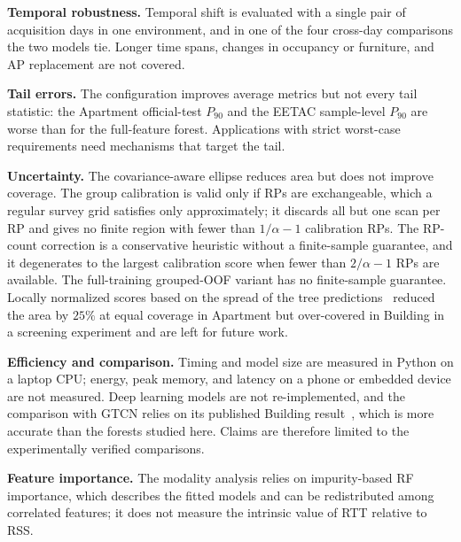 \textbf{Temporal robustness.} Temporal shift is evaluated with a single pair of acquisition days in one environment, and in one of the four cross-day comparisons the two models tie. Longer time spans, changes in occupancy or furniture, and AP replacement are not covered.

\textbf{Tail errors.} The configuration improves average metrics but not every tail statistic: the Apartment official-test $P_{90}$ and the EETAC sample-level $P_{90}$ are worse than for the full-feature forest. Applications with strict worst-case requirements need mechanisms that target the tail.

\textbf{Uncertainty.} The covariance-aware ellipse reduces area but does not improve coverage. The group calibration is valid only if RPs are exchangeable, which a regular survey grid satisfies only approximately; it discards all but one scan per RP and gives no finite region with fewer than $1/\alpha-1$ calibration RPs. The RP-count correction is a conservative heuristic without a finite-sample guarantee, and it degenerates to the largest calibration score when fewer than $2/\alpha-1$ RPs are available. The full-training grouped-OOF variant has no finite-sample guarantee. Locally normalized scores based on the spread of the tree predictions~\cite{lei2018distribution} reduced the area by $25\%$ at equal coverage in Apartment but over-covered in Building in a screening experiment and are left for future work.

\textbf{Efficiency and comparison.} Timing and model size are measured in Python on a laptop CPU; energy, peak memory, and latency on a phone or embedded device are not measured. Deep learning models are not re-implemented, and the comparison with GTCN relies on its published Building result~\cite{rana2025gtcn}, which is more accurate than the forests studied here. Claims are therefore limited to the experimentally verified comparisons.

\textbf{Feature importance.} The modality analysis relies on impurity-based RF importance, which describes the fitted models and can be redistributed among correlated features; it does not measure the intrinsic value of RTT relative to RSS.
